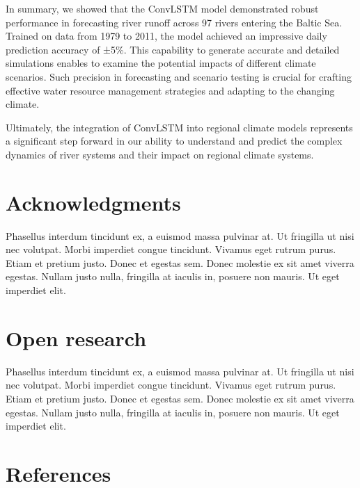 \documentclass[
]{agujournal2019}
\begin{document}
In summary, we showed that the ConvLSTM model demonstrated robust
performance in forecasting river runoff across 97 rivers entering the
Baltic Sea. Trained on data from 1979 to 2011, the model achieved an
impressive daily prediction accuracy of ±5\%. This capability to
generate accurate and detailed simulations enables to examine the
potential impacts of different climate scenarios. Such precision in
forecasting and scenario testing is crucial for crafting effective water
resource management strategies and adapting to the changing climate.

Ultimately, the integration of ConvLSTM into regional climate models
represents a significant step forward in our ability to understand and
predict the complex dynamics of river systems and their impact on
regional climate systems.

\hypertarget{acknowledgments}{%
\section{Acknowledgments}\label{acknowledgments}}

Phasellus interdum tincidunt ex, a euismod massa pulvinar at. Ut
fringilla ut nisi nec volutpat. Morbi imperdiet congue tincidunt.
Vivamus eget rutrum purus. Etiam et pretium justo. Donec et egestas sem.
Donec molestie ex sit amet viverra egestas. Nullam justo nulla,
fringilla at iaculis in, posuere non mauris. Ut eget imperdiet elit.

\hypertarget{open-research}{%
\section{Open research}\label{open-research}}

Phasellus interdum tincidunt ex, a euismod massa pulvinar at. Ut
fringilla ut nisi nec volutpat. Morbi imperdiet congue tincidunt.
Vivamus eget rutrum purus. Etiam et pretium justo. Donec et egestas sem.
Donec molestie ex sit amet viverra egestas. Nullam justo nulla,
fringilla at iaculis in, posuere non mauris. Ut eget imperdiet elit.

\hypertarget{references}{%
\section*{References}\label{references}}
\end{document}
